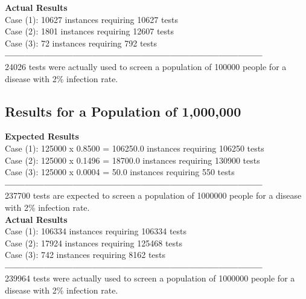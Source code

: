 \documentclass[letterpaper, 10pt,DIV=13]{scrartcl}
\numberwithin{equation}{section} %
\numberwithin{figure}{section} %
\numberwithin{table}{section} %
\begin{document}
\textbf{Actual Results} \\
Case (1): 10627 instances requiring 10627 tests \\
Case (2): 1801 instances requiring 12607 tests \\
Case (3): 72 instances requiring 792 tests \\
\textbf{\---------------------------------------------------------------------------------} \\ 
24026 tests were actually used to screen a population of 100000 people for a disease with 2\% infection rate.

\subsection{Results for a Population of 1,000,000}
\lstset{numbers=left, numberstyle=\tiny, stepnumber=1, numbersep=5pt, basicstyle=\footnotesize\ttfamily}
\textbf{Expected Results} \\
Case (1): 125000 x 0.8500 = 106250.0 instances requiring 106250 tests \\
Case (2): 125000 x 0.1496 = 18700.0 instances requiring 130900 tests \\
Case (3): 125000 x 0.0004 = 50.0 instances requiring 550 tests \\
\textbf{\---------------------------------------------------------------------------------} \\ 
237700 tests are expected to screen a population of 1000000 people for a disease with 2\% infection rate. \\

\textbf{Actual Results} \\
Case (1): 106334 instances requiring 106334 tests \\
Case (2): 17924 instances requiring 125468 tests \\
Case (3): 742 instances requiring 8162 tests \\
\textbf{\---------------------------------------------------------------------------------} \\ 
239964 tests were actually used to screen a population of 1000000 people for a disease with 2\% infection rate.
\end{document}
